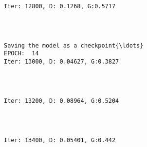 \documentclass[11pt]{article}
\begin{document}
    \begin{Verbatim}[commandchars=\\\{\}]

Iter: 12800, D: 0.1268, G:0.5717
    \end{Verbatim}

    \begin{center}
    \end{center}
    { \hspace*{\fill} \\}
    
    \begin{Verbatim}[commandchars=\\\{\}]

Saving the model as a checkpoint{\ldots}
EPOCH:  14
Iter: 13000, D: 0.04627, G:0.3827
    \end{Verbatim}

    \begin{center}
    \end{center}
    { \hspace*{\fill} \\}
    
    \begin{Verbatim}[commandchars=\\\{\}]

Iter: 13200, D: 0.08964, G:0.5204
    \end{Verbatim}

    \begin{center}
    \end{center}
    { \hspace*{\fill} \\}
    
    \begin{Verbatim}[commandchars=\\\{\}]

Iter: 13400, D: 0.05401, G:0.442
    \end{Verbatim}

    \begin{center}
    \end{center}
    { \hspace*{\fill} \\}
    
\end{document}
